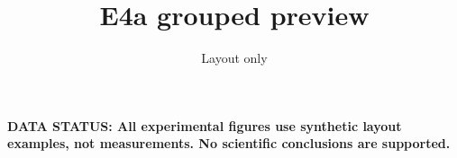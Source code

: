 \documentclass[sigconf,nonacm]{acmart}
\begin{document}
\title{E4a grouped preview}\author{Layout only}\maketitle
\noindent\textbf{DATA STATUS: All experimental figures use synthetic layout examples, not measurements. No scientific conclusions are supported.}\clearpage
\setcounter{figure}{6}
\clearpage
\end{document}
